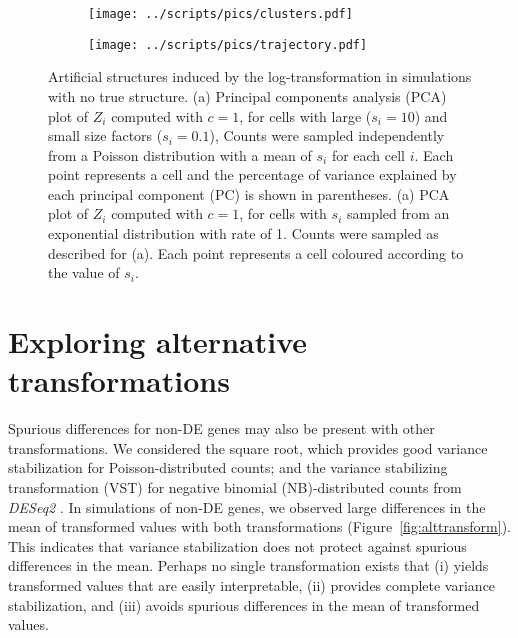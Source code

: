 \documentclass[10pt,letterpaper]{article}
\begin{document}
\begin{figure}[btp]
\centering
\begin{subfigure}[b]{0.49\textwidth}
    \texttt{[image: ../scripts/pics/clusters.pdf]}
    \caption{}
\end{subfigure}
\begin{subfigure}[b]{0.49\textwidth}
    \texttt{[image: ../scripts/pics/trajectory.pdf]}
    \caption{}
\end{subfigure}
\caption{Artificial structures induced by the log-transformation in simulations with no true structure.
(a) Principal components analysis (PCA) plot of $Z_i$ computed with $c=1$, for cells with large ($s_i =10$) and small size factors ($s_i=0.1$), 
Counts were sampled independently from a Poisson distribution with a mean of $s_i$ for each cell $i$. 
Each point represents a cell and the percentage of variance explained by each principal component (PC) is shown in parentheses. 
(a) PCA plot of $Z_i$ computed with $c=1$, for cells with $s_i$ sampled from an exponential distribution with rate of 1.
Counts were sampled as described for (a).
Each point represents a cell coloured according to the value of $s_i$.
}
\label{fig:structures}
\end{figure}

\section{Exploring alternative transformations}
Spurious differences for non-DE genes may also be present with other transformations.
We considered the square root, which provides good variance stabilization for Poisson-distributed counts;
and the variance stabilizing transformation (VST) for negative binomial (NB)-distributed counts from \emph{DESeq2} \cite{love2014moderated}.
In simulations of non-DE genes, we observed large differences in the mean of transformed values with both transformations (Figure~\ref{fig:alttransform}).
This indicates that variance stabilization does not protect against spurious differences in the mean.
Perhaps no single transformation exists that 
(i) yields transformed values that are easily interpretable,
(ii) provides complete variance stabilization, and
(iii) avoids spurious differences in the mean of transformed values.
\end{document}
